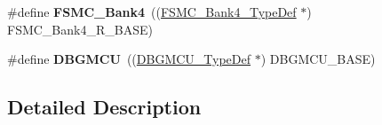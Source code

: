 \begin{DoxyCompactItemize}
\item 
\mbox{\label{group___peripheral__declaration_ga5aa00e4ac522693c6a21bc23ef5a96df}} 
\#define {\bfseries F\+S\+M\+C\+\_\+\+Bank4}~((\hyperlink{struct_f_s_m_c___bank4___type_def}{F\+S\+M\+C\+\_\+\+Bank4\+\_\+\+Type\+Def} $\ast$) F\+S\+M\+C\+\_\+\+Bank4\+\_\+\+R\+\_\+\+B\+A\+SE)
\item 
\mbox{\label{group___peripheral__declaration_ga92ec6d9ec2251fda7d4ce09748cd74b4}} 
\#define {\bfseries D\+B\+G\+M\+CU}~((\hyperlink{struct_d_b_g_m_c_u___type_def}{D\+B\+G\+M\+C\+U\+\_\+\+Type\+Def} $\ast$) D\+B\+G\+M\+C\+U\+\_\+\+B\+A\+SE)
\end{DoxyCompactItemize}


\subsection{Detailed Description}
